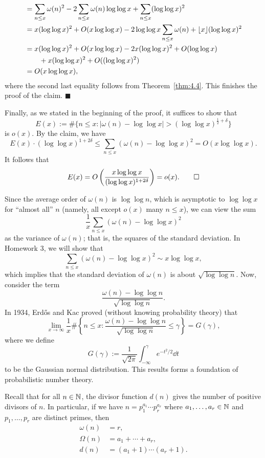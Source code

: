 \begin{pf}
\begin{align*}
        &= \sum_{n\leq x} \omega(n)^2 - 2\sum_{n\leq x} \omega(n)\log\log x 
        + \sum_{n\leq x} (\log\log x)^2 \\ 
        &= x(\log\log x)^2 + O(x\log\log x) - 2\log\log x \sum_{n\leq x} \omega(n)
        + \lfloor x\rfloor (\log\log x)^2 \\ 
        &= x(\log\log x)^2 + O(x\log\log x) - 2x(\log\log x)^2 + O(\log\log x) \\
        &\qquad + x(\log\log x)^2 + O((\log\log x)^2) \\ 
        &= O(x\log\log x), 
    \end{align*}
    where the second last equality follows from Theorem~\ref{thm:4.4}. This 
    finishes the proof of the claim. \hfill $\blacksquare$ 

    Finally, as we stated in the beginning of the proof, it suffices to show that 
    \[ E(x) := \#\{n \leq x : |\omega(n) - \log\log x| > (\log\log x)^{\frac12+\delta}\} \] 
    is $o(x)$. By the claim, we have 
    \[ E(x) \cdot (\log\log x)^{1+2\delta} 
    \leq \sum_{n\leq x} (\omega(n) - \log\log x)^2 = O(x\log\log x). \] 
    It follows that 
    \[ E(x) = O\left( \frac{x\log\log x}{(\log\log x)^{1+2\delta}} 
    \right) = o(x). \qedhere \] 
\end{pf}

\begin{remark}\label{remark:4.11}
    Since the average order of $\omega(n)$ is $\log\log n$, which is asymptotic 
    to $\log\log x$ for ``almost all'' $n$ (namely, all except $o(x)$ 
    many $n \leq x$), we can view the sum 
    \[ \frac1x \sum_{n\leq x} (\omega(n) - \log\log x)^2 \] 
    as the variance of $\omega(n)$; that is, the squares of the standard deviation. 
    In Homework 3, we will show that 
    \[ \sum_{n\leq x} (\omega(n) - \log\log x)^2 \sim x\log\log x, \] 
    which implies that the standard deviation of $\omega(n)$ is about 
    $\sqrt{\log\log n}$. Now, consider the term 
    \[ \frac{\omega(n) - \log\log n}{\sqrt{\log\log n}}. \] 
    In 1934, Erd\H{o}s and Kac proved (without knowing probability theory) that 
    \[ \lim_{x\to\infty} \frac1x \#\left\{ n\leq x : \frac{\omega(n) - 
    \log\log n}{\sqrt{\log\log n}} \leq \gamma \right\} = G(\gamma), \] 
    where we define 
    \[ G(\gamma) := \frac{1}{\sqrt{2\pi}} \int_{-\infty}^{\gamma} e^{-t^2/2}\dd t \] 
    to be the Gaussian normal distribution. This results forms a foundation 
    of probabilistic number theory. 
\end{remark}

Recall that for all $n \in \mathbb{N}$, the divisor function $d(n)$ gives the number of 
positive divisors of $n$. In particular, if we have $n = p_1^{a_1} \cdots p_r^{a_r}$
where $a_1, \dots, a_r \in \mathbb{N}$ and $p_1, \dots, p_r$ are distinct primes, then
\begin{align*} 
    \omega(n) &= r, \\ 
    \Omega(n) &= a_1 + \cdots + a_r, \\ 
    d(n) &= (a_1 + 1) \cdots (a_r + 1). 
\end{align*}

